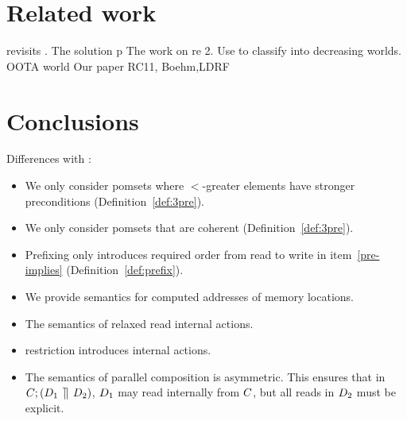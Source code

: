 \section{Related work}

\citet{BoehmOOTA} revisits \oota.  The solution p
The work on re
2. Use\cite{BoehmOOTA} to 
classify into decreasing worlds.
           OOTA world
              Our paper
                 RC11, Boehm,LDRF




\section{Conclusions}
\label{sec:outro}

Differences with \cite{2019-sp}:
\begin{itemize}
\item We only consider pomsets where $\lt$-greater elements have stronger
  preconditions (Definition~\ref{def:3pre}).
\item We only consider pomsets that are coherent (Definition~\ref{def:3pre}).
\item Prefixing only introduces required order from read to write in item~\ref{pre-implies} (Definition~\ref{def:prefix}).
\item We provide semantics for computed addresses of memory locations.
\item The semantics of relaxed read internal actions.
\item restriction introduces internal actions.
\item The semantics of parallel composition is asymmetric.  This ensures that
  in $C;(D_1\,\mathbin{\rrceil}\,D_2)$, $D_1$ may read internally from $C$,
  but all reads in $D_2$ must be explicit.
\end{itemize}


